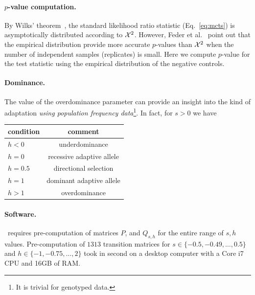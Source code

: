 \documentclass[11pt]{article}
\def\comale{\text{{\sc Comale}}}
\begin{document}
\paragraph{$p$-value computation.}
By Wilks’ theorem~\cite{williams2001weighing}, the standard likelihood
ratio statistic (Eq.~\ref{eq:mcts}) is asymptotically distributed
according to ${\cal X}^2$. However, Feder et
al.~\cite{feder2014Identifying} point out that the empirical
distribution provide more accurate $p$-values than ${\cal X}^2$ when the
number of independent samples (replicates) is small.  Here we compute
$p$-value for the test statistic using the empirical distribution of
the negative controls.


\paragraph{Dominance.}
The value of the overdominance parameter can provide an insight into the kind of adaptation \emph{using population frequency data}\footnote{It is trivial for genotyped data.}. In fact, for $s>0$ we have~\cite{gillespie2010population}  
\begin{center}
	\begin{tabular}{l|c}
		condition & comment\\
		\hline
		$h<0$ &  underdominance\\
		$h=0$ & recessive adaptive allele\\
		$h=0.5$ & directional selection\\
		$h=1$&	dominant adaptive allele	\\
		$h>1$ &overdominance
		\end{tabular}
		\end{center}
		
\paragraph{Software.}
\comale\ requires pre-computation of matrices $P$, and $Q_{s,h}$ for
the entire range of $s,h$ values. Pre-computation of $1313$ transition
matrices for $s\in\{-0.5,-0.49,\ldots,0.5 \}$ and $h\in
\{-1,-0.75,\ldots,2\}$ took in second  on a desktop computer
with a Core i7 CPU and 16GB of RAM.
\end{document}
